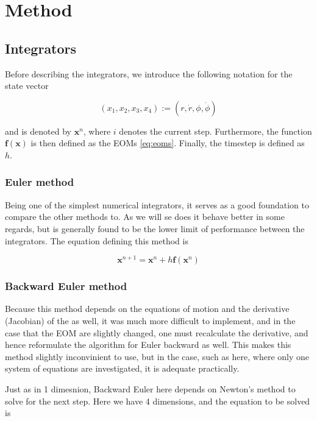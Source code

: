 \section{Method}\label{sec:method}

\subsection{Integrators}

Before describing the integrators, we introduce the following notation for the state vector

\begin{equation}
	(x_1, x_2, x_3, x_4) := (r, \dot{r}, \phi, \dot{\phi})
\end{equation}

and is denoted by $\textbf{x}^n$, where $i$ denotes the current step. Furthermore, the function $\textbf{f}(\textbf{x})$ is then defined as the EOMs \eqref{eq:eoms}. Finally, the timestep is defined as $h$.  

\subsubsection{Euler method}
Being one of the simplest numerical integrators, it serves as a good foundation to compare the other methods to. As we will se does it behave better in some regards, but is generally found to be the lower limit of performance between the integrators. The equation defining this method is

\begin{equation}\label{eq:euler-method-equation}
	\textbf{x}^{n+1} = \textbf{x}^n + h \textbf{f}(\textbf{x}^n) 
\end{equation}


\subsubsection{Backward Euler method}

Because this method depends on the equations of motion and the derivative (Jacobian) of the as well, it was much more difficult to implement, and in the case that the EOM are slightly changed, one must recalculate the derivative, and hence reformulate the algorithm for Euler backward as well. This makes this method slightly inconvinient to use, but in the case, such as here, where only one system of equations are investigated, it is adequate practically. 

Just as in 1 dimesnion, Backward Euler here depends on Newton's method to solve for the next step. Here we have 4 dimensions, and the equation to be solved is 

